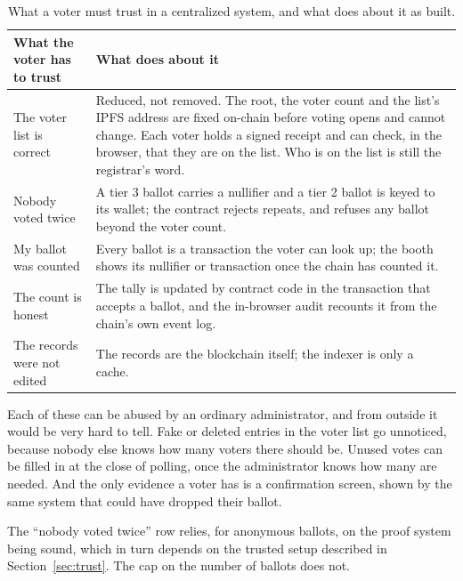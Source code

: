 \begin{table}[htbp]
  \centering
  \caption{What a voter must trust in a centralized system, and what \projectname{} does about it as built.}
  \label{tab:trust}
  \begin{tabular}{@{}L{5.2cm}L{10.5cm}@{}}
    \toprule
    \textbf{What the voter has to trust} & \textbf{What \projectname{} does about it}                                                     \\
    \midrule
    The voter list is correct
      & Reduced, not removed. The root, the voter count and the list's IPFS
        address are fixed on-chain before voting opens and cannot change. Each
        voter holds a signed receipt and can check, in the browser, that they
        are on the list. Who is on the list is still the registrar's word.             \\
    Nobody voted twice
      & A tier 3 ballot carries a nullifier and a tier 2 ballot is keyed to its
        wallet; the contract rejects repeats, and refuses any ballot beyond the
        voter count.                                                                    \\
    My ballot was counted
      & Every ballot is a transaction the voter can look up; the booth shows its
        nullifier or transaction once the chain has counted it.                         \\
    The count is honest
      & The tally is updated by contract code in the transaction that accepts a
        ballot, and the in-browser audit recounts it from the chain's own event
        log.                                                                            \\
    The records were not edited
      & The records are the blockchain itself; the indexer is only a cache.             \\
    \bottomrule
  \end{tabular}
\end{table}

Each of these can be abused by an ordinary administrator, and from outside it
would be very hard to tell. Fake or deleted entries in the voter list go
unnoticed, because nobody else knows how many voters there should be. Unused
votes can be filled in at the close of polling, once the administrator knows
how many are needed. And the only evidence a voter has is a confirmation
screen, shown by the same system that could have dropped their ballot.

The ``nobody voted twice'' row relies, for anonymous ballots, on the proof
system being sound, which in turn depends on the trusted setup described in
Section~\ref{sec:trust}. The cap on the number of ballots does not.

